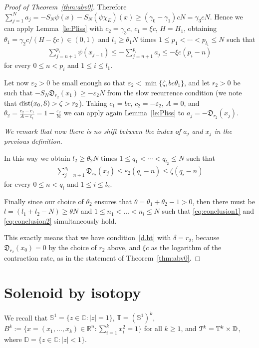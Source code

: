 \documentclass[reqno,12pt,a4paper]{amsart}
\theoremstyle{plain}
\theoremstyle{definition}
\begin{document}
\begin{proof}[Proof of Theorem~\ref{thm:abv0}]
Therefore $\sum_{j=1}^{N} a_j = -S_N\psi(x) -
S_N(\psi\chi_E)(x) \ge (\gamma_0-\gamma_1)c N = \gamma_3 c
N$. Hence we can apply Lemma~\ref{le:Pliss} with
$c_2=\gamma_3 c$, $c_1=\xi c$, $H=H_1$, obtaining
$\theta_1=\gamma_2 c/(H-\xi c)\in(0,1)$ and $l_1\ge \theta_1
N$ times $1 \le p_1< \cdots <p_{l_1}\le N$ such that
  \begin{align}
    \label{eq:conclusion1}
    \sum_{j=n+1}^{p_i} \psi(x_{j-1}) \le -\sum_{j=n+1}^{p_i}
    a_j \le -\xi c  (p_i-n)
  \end{align}
for every $0 \le n < p_i$ and $1\le i\le l_1$.

Let now $\varepsilon_2>0$ be small enough so that
$\varepsilon_2 < \min\{\zeta, b c \theta_1\}$, and let
$r_2>0$ be such that $-S_N{{\mathfrak D}}_{r_2}(x_1) \ge -{\varepsilon}_2 N$
from the slow recurrence condition (we note that
${\operatorname{dist}}(x_0,{\EuScript{S}})>\zeta>r_2$).  Taking $c_1= b c$,
$c_2=-\varepsilon_2$, $A=0$, and
$
\theta_2=\frac{c_2-c_1}{A-c_1}=1-\frac{\varepsilon_2}{bc}
$
we can apply again Lemma~\ref{le:Pliss} to
$a_j=-{{\mathfrak D}}_{r_2}(x_j)$.

\emph{We remark that now there is no shift
between the index of $a_j$ and $x_j$ in the previous
definition. }

In this way we obtain $l_2\ge\theta_2 N$ times $1\le q_1 <
\cdots < q_{l_2}\le N$ such that
\begin{align}
  \label{eq:conclusion2}
  \sum_{j=n+1}^{q_i} {{\mathfrak D}}_{r_2}(x_j)\le {\varepsilon}_2
   (q_i - n) \le \zeta (q_i-n)
\end{align}
for every $0 \le n < q_i$ and $1\le i \le l_2$.

Finally since our choice of $\theta_2$ ensures that
$\theta=\theta_1+\theta_2-1>0$, then there must be
$l=(l_1+l_2-N)\ge \theta N$ and $1\le n_1 <\ldots <n_l \le
N$ such that \eqref{eq:conclusion1} and
\eqref{eq:conclusion2} simultaneously hold.

This exactly means that we have condition~\eqref{d.ht} with
$\delta=r_2$, because ${{\mathfrak D}}_{r_2}(x_0)=0$ by the choice
of $r_2$ above, and $\xi c$ as the logarithm of the
contraction rate, as in the statement of
Theorem~\ref{thm:abv0}.
\end{proof}

\section{Solenoid by isotopy}
\label{sec:isotopy}

We recall that ${{\mathbb S}}^1=\{z\in{{\mathbb C}}: |z|=1\}$, ${{\mathbb T}}=({{\mathbb S}}^1)^k$,
$B^k:=\{ x=(x_1,\dots,x_k)\in{{\mathbb R}}^n: \sum_{i=1}^k x_i^2=1\}$
for all $k\ge1$, and ${\EuScript{T}}^k={{\mathbb T}}^k\times{{\mathbb D}}$, where
${{\mathbb D}}=\{z\in{{\mathbb C}}: |z|<1\}$.
\end{document}
